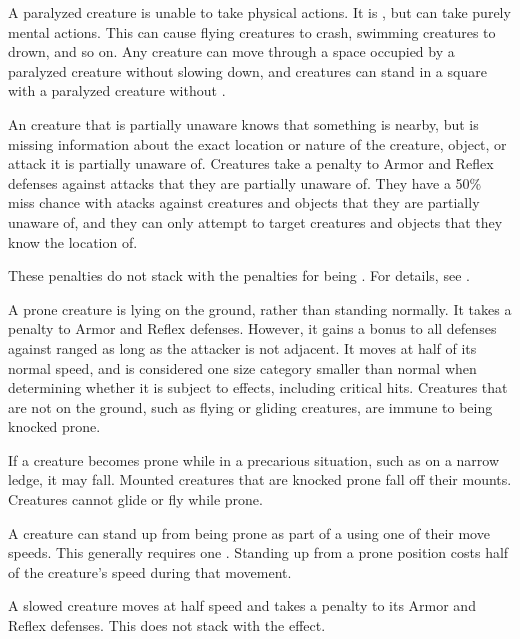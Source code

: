      A paralyzed creature is unable to take physical actions. It is \helpless, but can take purely mental actions. This can cause flying creatures to crash, swimming creatures to drown, and so on. Any creature can move through a space occupied by a paralyzed creature without slowing down, and creatures can stand in a square with a paralyzed creature without \squeezing.

     An creature that is partially unaware knows that something is nearby, but is missing information about the exact location or nature of the creature, object, or attack it is partially unaware of.
    Creatures take a  penalty to Armor and Reflex defenses against attacks that they are partially unaware of.
    They have a 50\% miss chance with  atacks against creatures and objects that they are partially unaware of, and they can only attempt to target creatures and objects that they know the location of.

    These penalties do not stack with the penalties for being \unaware.
    For details, see .

     A prone creature is lying on the ground, rather than standing normally.
    It takes a  penalty to Armor and Reflex defenses.
    However, it gains a  bonus to all defenses against ranged  as long as the attacker is not adjacent.
    It moves at half of its normal speed, and is considered one size category smaller than normal when determining whether it is subject to  effects, including critical hits.
    Creatures that are not on the ground, such as flying or gliding creatures, are immune to being knocked prone.

    If a creature becomes prone while in a precarious situation, such as on a narrow ledge, it may fall.
    Mounted creatures that are knocked prone fall off their mounts.
    Creatures cannot glide or fly while prone.

    A creature can stand up from being prone as part of a  using one of their move speeds.
    This generally requires one .
    Standing up from a prone position costs half of the creature's speed during that movement.

     A slowed creature moves at half speed and takes a  penalty to its Armor and Reflex defenses.
    This does not stack with the \immobilized effect.

